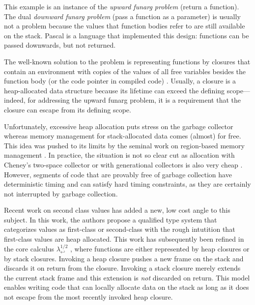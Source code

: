 \documentclass[sigplan,review,dvipsnames,screen,10pt]{acmart}
\newcommand{\LamWhatif}{\ensuremath{\lambda^{1/2}_{\hookleftarrow}}}
\begin{document}
This example is an instance of the \emph{upward funarg problem}
(return a function). The
dual \emph{downward funarg problem} (pass a function as a parameter)
is usually not a problem 
because the values that function bodies refer to are still available
on the stack. Pascal \cite{jensen91:_pascal} is a language that implemented this design:
functions can be passed downwards, but not returned. 

The well-known solution to the problem is representing functions by
closures that contain an environment with copies of the values of all
free variables besides the function body (or the code pointer in
compiled code) \cite{landin66,DBLP:conf/acm/Reynolds72}.
Usually, a closure is a heap-allocated data structure because its
lifetime can exceed the defining scope---indeed, for addressing the
upward funarg problem, it is a requirement that the closure can escape
from its defining scope.

Unfortunately, excessive heap allocation puts stress on the garbage
collector whereas memory management for stack-allocated data comes
(almost) for free. This idea was pushed to its limits by the seminal work on
region-based memory management
\cite{DBLP:conf/popl/TofteT94,DBLP:journals/iandc/TofteT97}. In
practice, the situation is not so clear cut as allocation with
Cheney's two-space collector or with generational collectors is also
very cheap \cite{DBLP:journals/jfp/AppelS96}. However, segments of code that are provably free of
garbage collection have deterministic timing and can satisfy hard
timing constraints, as they are certainly not interrupted by garbage
collection. 

Recent work on second class values
\cite{DBLP:conf/oopsla/OsvaldEWAR16} has
added a new, low cost angle to this subject. In this work, the authors
propose a qualified type system that categorizes values as first-class
or second-class with the rough intutition that first-class values are
heap allocated. This work has subsequently been refined in the core
calculus $\LamWhatif$
\cite{DBLP:conf/ecoop/XhebrajB0R22}, where functions are
either represented by heap closures or by stack closures. Invoking a
heap closure pushes a new frame on the stack and discards it on return from the
closure. Invoking a stack closure merely extends the current stack
frame and this extension is \emph{not} discarded on return.
This model enables writing code that can locally allocate data on the
stack as long as it does not escape from the most recently invoked
heap closure.
\end{document}
